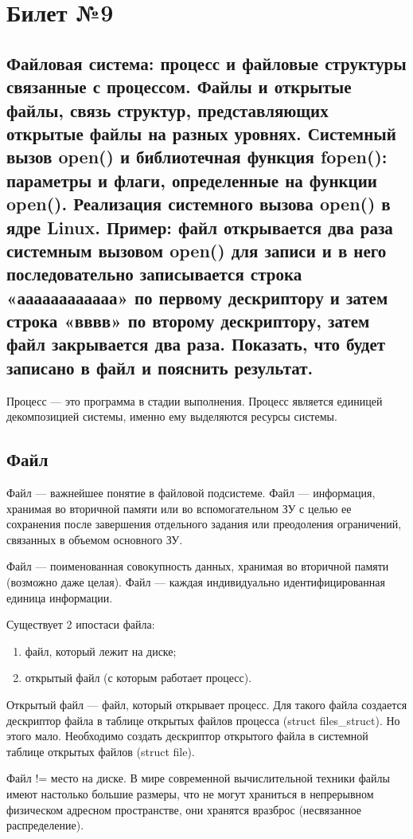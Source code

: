 \chapter{Билет №9}

\section*{Файловая система: процесс и файловые структуры связанные с процессом. Файлы и открытые файлы, связь структур, представляющих открытые файлы на разных уровнях. Системный вызов open() и библиотечная функция fopen(): параметры и флаги, определенные на функции open(). Реализация системного вызова open() в ядре Linux. Пример: файл открывается два раза системным вызовом open() для записи и в него последовательно записывается строка «аааааааааааа» по первому дескриптору и затем строка «вввв» по второму дескриптору, затем файл закрывается два раза. Показать, что будет записано в файл и пояснить результат.}

Процесс — это программа в стадии выполнения.
Процесс является единицей декомпозицией системы, именно ему выделяются ресурсы системы.

\section{Файл}
Файл --- важнейшее понятие в файловой подсистеме. Файл --- информация, хранимая во вторичной памяти или во вспомогательном ЗУ с целью ее сохранения после завершения отдельного задания или преодоления ограничений, связанных в объемом основного ЗУ.

Файл --- поименованная совокупность данных, хранимая во вторичной памяти (возможно даже целая). Файл --- каждая индивидуально идентифицированная единица информации.

Существует 2 ипостаси файла:
\begin{enumerate}
	\item файл, который лежит на диске;
	\item открытый файл (с которым работает процесс).
\end{enumerate}

Открытый файл — файл, который открывает процесс. Для такого файла создается дескриптор файла в таблице открытых файлов процесса (struct files\_struct). Но этого мало. Необходимо создать дескриптор открытого файла в системной таблице открытых файлов (struct file).

Файл != место на диске. В мире современной вычислительной техники файлы имеют настолько большие размеры, что не могут храниться в непрерывном физическом адресном пространстве, они хранятся вразброс (несвязанное распределение).


